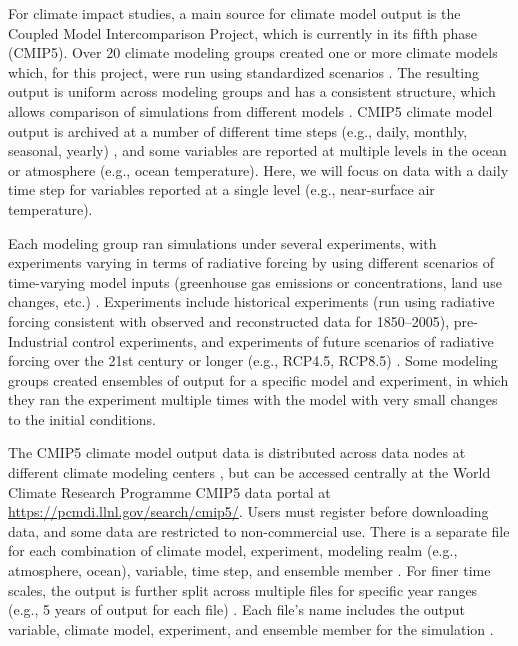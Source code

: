 For climate impact studies, a main source for climate model output is
the Coupled Model Intercomparison Project, which is currently in its
fifth phase (CMIP5). Over 20 climate modeling groups created one or more
climate models which, for this project, were run using standardized
scenarios \citep{taylor2012overview}. The resulting output is uniform
across modeling groups and has a consistent structure, which allows
comparison of simulations from different models \citep{IPCCch9}. CMIP5
climate model output is archived at a number of different time steps
(e.g., daily, monthly, seasonal, yearly) \citep{taylor2010cmip5}, and
some variables are reported at multiple levels in the ocean or
atmosphere (e.g., ocean temperature). Here, we will focus on data with a
daily time step for variables reported at a single level (e.g.,
near-surface air temperature).

Each modeling group ran simulations under several experiments, with
experiments varying in terms of radiative forcing by using different
scenarios of time-varying model inputs (greenhouse gas emissions or
concentrations, land use changes, etc.)
\citep{taylor2012overview, IPCCch9}. Experiments include historical
experiments (run using radiative forcing consistent with observed and
reconstructed data for 1850--2005), pre-Industrial control experiments,
and experiments of future scenarios of radiative forcing over the 21st
century or longer (e.g., RCP4.5, RCP8.5) \citep{taylor2012overview}.
Some modeling groups created ensembles of output for a specific model
and experiment, in which they ran the experiment multiple times with the
model with very small changes to the initial conditions.

The CMIP5 climate model output data is distributed across data nodes at
different climate modeling centers \citep{taylor2012overview}, but can
be accessed centrally at the World Climate Research Programme CMIP5 data
portal at \url{https://pcmdi.llnl.gov/search/cmip5/}. Users must
register before downloading data, and some data are restricted to
non-commercial use. There is a separate file for each combination of
climate model, experiment, modeling realm (e.g., atmosphere, ocean),
variable, time step, and ensemble member
\citep{taylor2012overview, taylor2010cmip5}. For finer time scales, the
output is further split across multiple files for specific year ranges
(e.g., 5 years of output for each file) \citep{taylor2010cmip5}. Each
file's name includes the output variable, climate model, experiment, and
ensemble member for the simulation \citep{taylor2010cmip5}.

